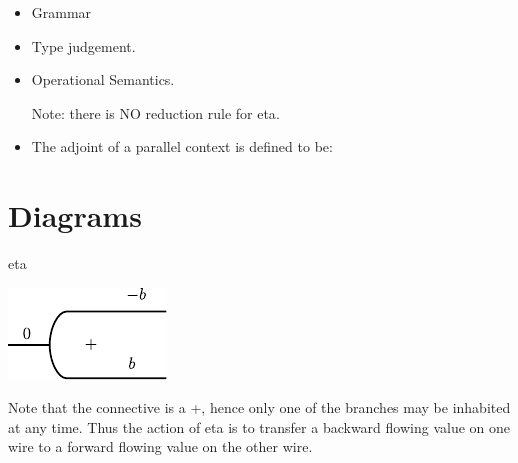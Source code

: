 \documentclass[preprint]{sigplanconf}
\begin{document}
\begin{itemize}
\item Grammar

\item
Type judgement.


\item
Operational Semantics.

Note: there is NO reduction rule for {{eta}}. 

\item
The adjoint of a parallel context is defined to be:




\end{itemize}


\section{Diagrams}

{{eta}}

\begin{center}
  \includegraphics{diagrams/eta.pdf}
\end{center}

Note that the connective is a {{+}}, hence only one of the branches
may be inhabited at any time. Thus the action of {{eta}} is to
transfer a backward flowing value on one wire to a forward flowing
value on the other wire.
\end{document}
